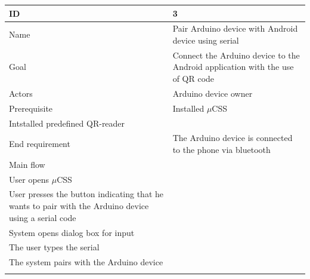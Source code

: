 \begin{table}
    \begin{tabular}{|l|l|}
        \hline
        ID               & 3                                                                                                                                                                                                                                             \\ \hline
        Name             & Pair Arduino device with Android device using serial                                                                                                                                                                                          \\ 
        Goal             & Connect the Arduino device to the Android application with the use of QR code                                                                                                                                                                 \\ 
        Actors           & Arduino device owner     								             \\ 
        Prerequisite     &     Installed $\mu$CSS \\     Intstalled predefined QR-reader                                                                                                                                                                                 \\ 
        End requirement  & The Arduino device is connected to the phone via bluetooth                                                                                                                                                                                    \\ 
        Main flow        & \begin{itemize} \\ \item{User opens $\mu$CSS} \\ \item{User presses the button indicating that he wants to pair with the Arduino device using a serial code} \\ \item{System opens dialog box for input} \\ \item{The user types the serial} \\ \item{The system pairs with the Arduino device} \\ \end{itemize} \\


\end{tabular}
\end{table}
